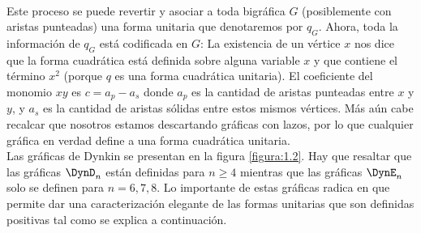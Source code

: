 \paragraph*{}
Este proceso se puede revertir y asociar a toda bigráfica $G$ (posiblemente con aristas punteadas) una forma unitaria que denotaremos por \textbf{$q_{G}$}. Ahora, toda la información de $q_{G}$ está codificada en $G$: La existencia de un vértice $x$ nos dice que la forma cuadrática está definida sobre alguna variable $x$ y que contiene el término $x^{2}$ (porque $q$ es una forma cuadrática unitaria). El coeficiente del monomio $xy$ es $c = a_{p} - a_{s}$ donde $a_{p}$ es la cantidad de aristas punteadas entre $x$ y $y$, y $a_{s}$ es la cantidad de aristas sólidas entre estos mismos vértices. Más aún cabe recalcar que nosotros estamos descartando gráficas con lazos, por lo que cualquier gráfica en verdad define a una forma cuadrática unitaria.\\
Las gráficas de Dynkin se presentan en la figura \ref{figura:1.2}. Hay que resaltar que las gráficas $\DynD_{n}$ están definidas para $n \geq 4$ mientras que las gráficas $\DynE_{n}$ solo se definen para $n = 6, 7, 8$. Lo importante de estas gráficas radica en que permite dar una caracterización elegante de las formas unitarias que son definidas positivas tal como se explica a continuación.


